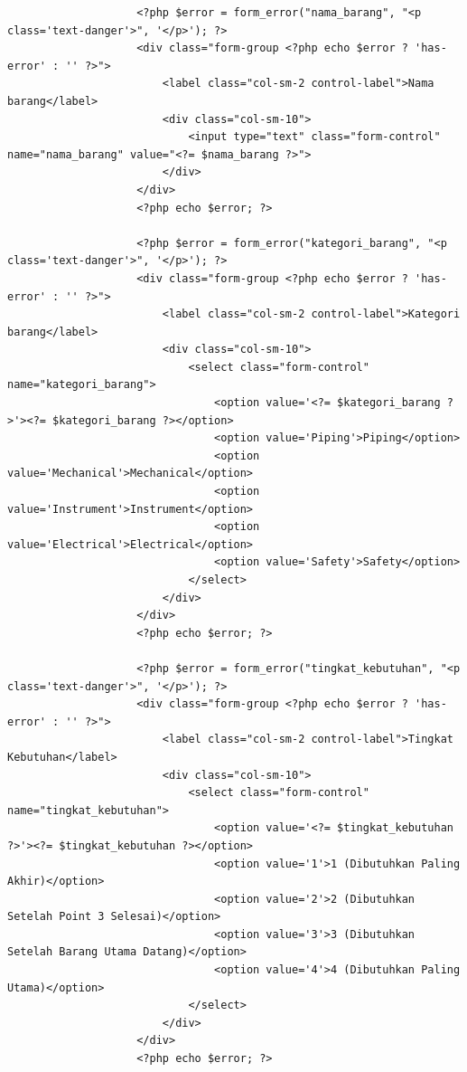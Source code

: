 \begin{enumerate}
\begin{enumerate}
\begin{lstlisting}
                    <?php $error = form_error("nama_barang", "<p class='text-danger'>", '</p>'); ?>
                    <div class="form-group <?php echo $error ? 'has-error' : '' ?>">
                        <label class="col-sm-2 control-label">Nama barang</label>
                        <div class="col-sm-10">
                            <input type="text" class="form-control" name="nama_barang" value="<?= $nama_barang ?>">
                        </div>
                    </div>
                    <?php echo $error; ?>

                    <?php $error = form_error("kategori_barang", "<p class='text-danger'>", '</p>'); ?>
                    <div class="form-group <?php echo $error ? 'has-error' : '' ?>">
                        <label class="col-sm-2 control-label">Kategori barang</label>
                        <div class="col-sm-10">
                            <select class="form-control" name="kategori_barang">
                                <option value='<?= $kategori_barang ?>'><?= $kategori_barang ?></option>
                                <option value='Piping'>Piping</option>
                                <option value='Mechanical'>Mechanical</option>
                                <option value='Instrument'>Instrument</option>
                                <option value='Electrical'>Electrical</option>
                                <option value='Safety'>Safety</option>
                            </select>
                        </div>
                    </div>
                    <?php echo $error; ?>

                    <?php $error = form_error("tingkat_kebutuhan", "<p class='text-danger'>", '</p>'); ?>
                    <div class="form-group <?php echo $error ? 'has-error' : '' ?>">
                        <label class="col-sm-2 control-label">Tingkat Kebutuhan</label>
                        <div class="col-sm-10">
                            <select class="form-control" name="tingkat_kebutuhan">
                                <option value='<?= $tingkat_kebutuhan ?>'><?= $tingkat_kebutuhan ?></option>
                                <option value='1'>1 (Dibutuhkan Paling Akhir)</option>
                                <option value='2'>2 (Dibutuhkan Setelah Point 3 Selesai)</option>
                                <option value='3'>3 (Dibutuhkan Setelah Barang Utama Datang)</option>
                                <option value='4'>4 (Dibutuhkan Paling Utama)</option>
                            </select>
                        </div>
                    </div>
                    <?php echo $error; ?>


\end{lstlisting}
\end{enumerate}
\end{enumerate}
